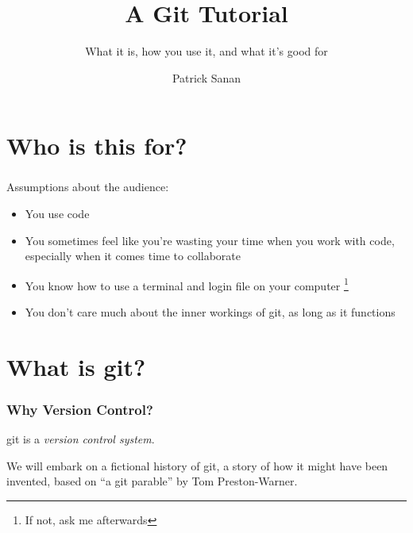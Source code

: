 \documentclass{beamer}
\author{Patrick Sanan}
\institute[USI Lugano ICS / ETH Z\"{u}rich ERDW] 
{
USI Lugano / ETH Z\"{u}rich\\
}
\title{A Git Tutorial}
\subtitle[]{What it is, how you use it, and what it's good for}
\date[]{}
\begin{document}

\begin{frame}[fragile]
\titlepage 
\end{frame}


\begin{frame}
\tableofcontents 
\end{frame}

\section{Who is this for?}
\begin{frame}[fragile]
\frametitle{}
Assumptions about the audience:
\begin{itemize}
\item You use code
\item You sometimes feel like you're wasting your time when you work with code, especially when it comes time to collaborate
\item You know how to use a terminal and login file on your computer \footnote{If not, ask me afterwards}
\item You don't care much about the inner workings of git, as long as it functions
\end{itemize}
\end{frame}





\section{What is git?}
\begin{frame}[fragile]
\frametitle{Why Version Control?}
git is a \emph{version control system}.

We will embark on a fictional history of git, a story of how it might have been invented, based on ``a git parable'' by Tom Preston-Warner.
\end{frame}
\end{document}

